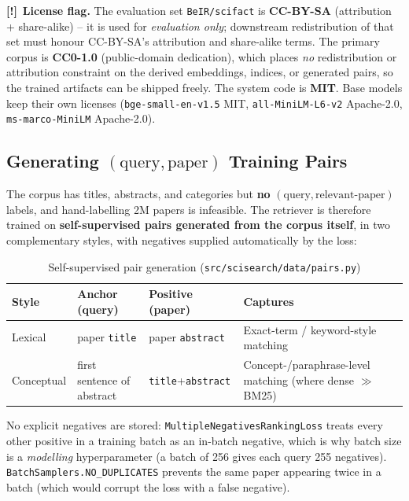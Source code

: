 \documentclass[12pt,a4paper]{article}
\newcommand{\flag}{\textbf{[\textcolor{red!70!black}{!}]}}
\begin{document}
\flag\ \textbf{License flag.} The evaluation set \texttt{BeIR/scifact} is \textbf{CC-BY-SA} (attribution + share-alike) -- it is used for \emph{evaluation only}; downstream redistribution of that set must honour CC-BY-SA's attribution and share-alike terms. The primary corpus is \textbf{CC0-1.0} (public-domain dedication), which places \emph{no} redistribution or attribution constraint on the derived embeddings, indices, or generated pairs, so the trained artifacts can be shipped freely. The system code is \textbf{MIT}. Base models keep their own licenses (\texttt{bge-small-en-v1.5} MIT, \texttt{all-MiniLM-L6-v2} Apache-2.0, \texttt{ms-marco-MiniLM} Apache-2.0).

\subsection{Generating \texorpdfstring{$(\text{query}, \text{paper})$}{(query, paper)} Training Pairs}

The corpus has titles, abstracts, and categories but \textbf{no} $(\text{query}, \text{relevant-paper})$ labels, and hand-labelling 2M papers is infeasible. The retriever is therefore trained on \textbf{self-supervised pairs generated from the corpus itself}, in two complementary styles, with negatives supplied automatically by the loss:

\begin{table}[H]
\centering
\caption{Self-supervised pair generation (\texttt{src/scisearch/data/pairs.py})}
\small
\begin{tabularx}{\linewidth}{@{} l l l L @{}}
\toprule
\textbf{Style} & \textbf{Anchor (query)} & \textbf{Positive (paper)} & \textbf{Captures} \\
\midrule
Lexical & paper \texttt{title} & paper \texttt{abstract} & Exact-term / keyword-style matching \\
Conceptual & first sentence of abstract & \texttt{title}+\texttt{abstract} & Concept-/paraphrase-level matching (where dense $\gg$ BM25) \\
\bottomrule
\end{tabularx}
\end{table}

No explicit negatives are stored: \texttt{MultipleNegativesRankingLoss} treats every other positive in a training batch as an in-batch negative, which is why batch size is a \emph{modelling} hyperparameter (a batch of 256 gives each query 255 negatives). \texttt{BatchSamplers.NO\_DUPLICATES} prevents the same paper appearing twice in a batch (which would corrupt the loss with a false negative).
\end{document}
